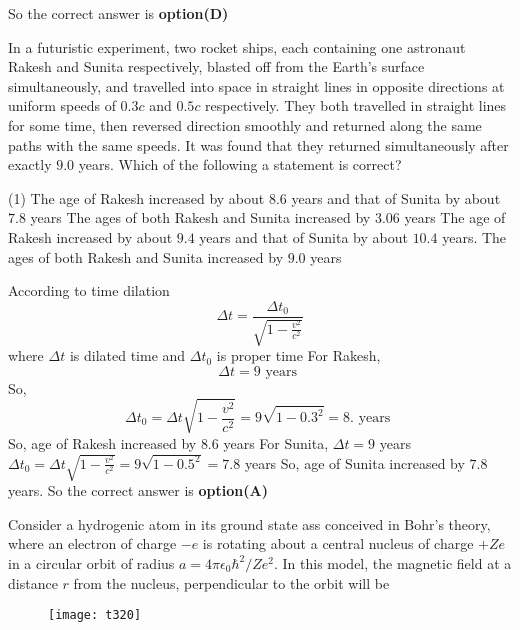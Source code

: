 \begin{questions}
\begin{answer}
	So the correct answer is \textbf{option(D)}
\end{answer}
\begin{minipage}{\textwidth}
	\question In a futuristic experiment, two rocket ships, each containing one astronaut Rakesh and Sunita respectively, blasted off from the Earth's surface simultaneously, and travelled into space in straight lines in opposite directions at uniform speeds of $0.3 c$ and $0.5 c$ respectively. They both travelled in straight lines for some time, then reversed direction smoothly and returned along the same paths with the same speeds. It was found that they returned simultaneously after exactly $9.0$ years. Which of the following a statement is correct?
\end{minipage}
\begin{tasks}(1)
	\task[\textbf{A.}]   The age of Rakesh increased by about $8.6$ years and that of Sunita by about $7.8$ years
	\task[\textbf{B.}] The ages of both Rakesh and Sunita increased by $3.06$ years
	\task[\textbf{C.}] The age of Rakesh increased by about $9.4$ years and that of Sunita by about $10.4$ years.
	\task[\textbf{D.}] The ages of both Rakesh and Sunita increased by $9.0$ years
\end{tasks}
\begin{answer}
	According to time dilation
	$$
	\Delta t=\frac{\Delta t_{0}}{\sqrt{1-\frac{v^{2}}{c^{2}}}}
	$$
	where $\Delta t$ is dilated time and $\Delta t_{0}$ is proper time
	For Rakesh,
	$$
	\Delta t=9 \text { years }
	$$
	So,
	$$
	\Delta t_{0}=\Delta t \sqrt{1-\frac{v^{2}}{c^{2}}}=9 \sqrt{1-0.3^{2}}=8 \text {. years }
	$$
	So, age of Rakesh increased by $8.6$ years
	For Sunita,
	$\Delta t=9$ years
	$\Delta t_{0}=\Delta t \sqrt{1-\frac{v^{2}}{c^{2}}}=9 \sqrt{1-0.5^{2}}=7.8$ years
	So, age of Sunita increased by $7.8$ years.
	So the correct answer is \textbf{option(A)}
\end{answer}
\begin{minipage}{\textwidth}
	\question Consider a hydrogenic atom in its ground state ass conceived in Bohr's theory, where an electron of charge $-e$ is rotating about a central nucleus of charge $+Z e$ in a circular orbit of radius $a=4 \pi \epsilon_{0} \hbar^{2} / Z e^{2}$. In this model, the magnetic field at a distance $r$ from the nucleus, perpendicular to the orbit will be
\end{minipage}
\begin{figure}[H]
	\centering
	\texttt{[image: t320]}
\end{figure}

\end{questions}
